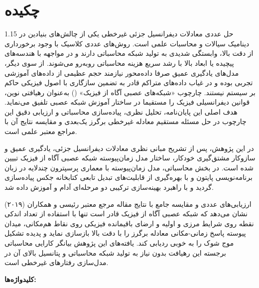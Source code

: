 \chapter*{چکیده}
{}

\begin{spacing}{1.15}
حل عددی معادلات دیفرانسیل جزئی غیرخطی یکی از چالش‌های بنیادین در دینامیک سیالات و محاسبات علمی است. روش‌های عددی کلاسیک با وجود برخورداری از دقت بالا، وابستگی شدیدی به تولید شبکه محاسباتی دارند و در مواجهه با هندسه‌های پیچیده یا ابعاد بالا با رشد سریع هزینه محاسباتی روبه‌رو می‌شوند. از سوی دیگر، مدل‌های یادگیری عمیق صرفا داده‌محور نیازمند حجم عظیمی از داده‌های آموزشی تجربی بوده و در غیاب داده‌های متراکم قادر به تضمین سازگاری با اصول فیزیکی حاکم بر سیستم نیستند. چارچوب «شبکه‌های عصبی آگاه از فیزیک» () به‌عنوان رهیافتی نوین، قوانین دیفرانسیلی فیزیک را مستقیما در ساختار آموزش شبکه عصبی تلفیق می‌نماید. هدف اصلی این پایان‌نامه، تحلیل نظری، پیاده‌سازی محاسباتی و ارزیابی دقیق این چارچوب در حل مسئله مستقیم معادله غیرخطی برگرز یک‌بعدی و مقایسه نتایج آن با مراجع معتبر علمی است.

در این پژوهش، پس از تشریح مبانی نظری معادلات دیفرانسیل جزئی، یادگیری عمیق و سازوکار مشتق‌گیری خودکار، ساختار مدل زمان‌پیوسته شبکه عصبی آگاه از فیزیک تبیین شده است. در بخش محاسباتی، مدل زمان‌پیوسته با معماری پرسپترون چندلایه در زبان برنامه‌نویسی پایتون و با بهره‌گیری از قابلیت‌های تبدیل تابعی کتابخانه جکس پیاده‌سازی گردید و با راهبرد بهینه‌سازی ترکیبی دو مرحله‌ای آدام و  آموزش داده شد.

ارزیابی‌های عددی و مقایسه جامع با نتایج مقاله مرجع معتبر رئیسی و همکاران (۲۰۱۹) نشان می‌دهد که شبکه عصبی آگاه از فیزیک قادر است تنها با استفاده از تعداد اندکی نقطه روی شرایط مرزی و اولیه و ارضای باقیمانده فیزیکی روی نقاط هم‌مکانی، میدان پیوسته پاسخ زمانی-مکانی معادله برگرز را با دقت بالا بازسازی نماید و پدیده تشکیل موج شوک را به خوبی ردیابی کند. یافته‌های این پژوهش بیانگر کارایی محاسباتی برجسته این رهیافت بدون نیاز به تولید شبکه محاسباتی و پتانسیل بالای آن در مدل‌سازی رفتارهای غیرخطی است.

\vspace{0.3cm}
\noindent\textbf{کلیدواژه‌ها:} \KeywordsFa
\end{spacing}
